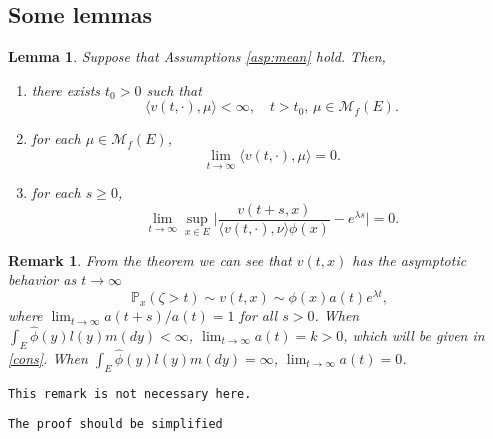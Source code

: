 \documentclass[12pt,a4paper]{amsart}
\numberwithin{equation}{section}
\theoremstyle{plain}
\newtheorem{lem}[thm]{Lemma}
\newtheorem{remark}{Remark}
\theoremstyle{definition}
\theoremstyle{remark}
\begin{document}
\subsection{Some lemmas}
\begin{lem}\label{lem:extinc}
	Suppose that Assumptions \ref{asp:mean} hold. Then,
\begin{enumerate}
\item
	there exists $t_0>0$ such that
\[
	\langle v(t,\cdot),\mu\rangle <\infty, \quad t>t_0, \, \mu \in \mathcal M_f(E).
\]
\item	for each $\mu \in \mathcal M_f(E)$,
\[
	\lim_{t\rightarrow\infty}\langle v(t,\cdot),\mu\rangle=0.
\]
\item
	for each $s\geq 0$,
\begin{equation} \label{one point ratio limit}
	\lim_{t\to \infty} \sup_{x\in E}\Big|\frac{v(t+s,x)}{\langle v(t,\cdot),\nu\rangle\phi(x) } - e^{\lambda s} \Big|
	=0.
\end{equation}
\end{enumerate}
\end{lem}
\begin{remark}
 From the theorem we can see that $v(t,x)$  has the asymptotic behavior as $t\to\infty$
 \[
 \mathbb P_x(\zeta>t)\sim v(t,x)\sim \phi(x)a(t)e^{\lambda t},
 \]
 where $\lim_{t\rightarrow\infty}a(t+s)/a(t)=1$ for all $s>0$.  When $\int_E\widehat\phi(y)l(y)m(dy)<\infty$, $\lim_{t\rightarrow\infty}a(t)=k>0$, which will be given in \eqref{cons}.  When $\int_E\widehat\phi(y)l(y)m(dy)=\infty$, $\lim_{t\rightarrow\infty}a(t)=0$.
 \end{remark}

{\tt This remark is not necessary here.}

{\tt The proof should be simplified}
\end{document}
